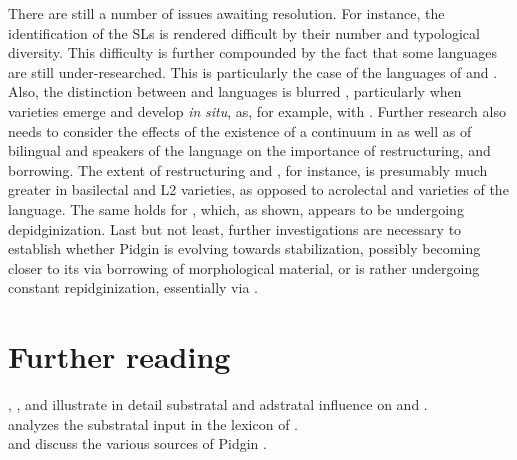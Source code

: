 \documentclass[output=paper]{langsci/langscibook}
\begin{document}
  There are still a number of issues awaiting resolution. For instance, the identification of the SLs is rendered difficult by their number and typological diversity. This difficulty is further compounded by the fact that some  languages are still under-researched. This is particularly the case of the  languages of   and . Also, the distinction between  and  languages is blurred \citep[132]{Nakao2012}, particularly when varieties emerge and develop \textit{in} \textit{situ}, as, for example, with  . Further research also needs to consider the effects of the existence of a  continuum in   as well as of bilingual and  speakers of the language on the  importance of restructuring,  and borrowing. The extent of restructuring and , for instance, is presumably much greater in basilectal and L2 varieties, as opposed to acrolectal and  varieties of the language. The same holds for  , which, as shown, appears to be undergoing depidginization. Last but not least, further investigations are necessary to establish whether  Pidgin  is evolving towards stabilization, possibly becoming closer to its  via borrowing of morphological material, or is rather undergoing constant repidginization, essentially via .  

\section*{Further reading}

\citet{Miller1993}, \citet{Nakao2012}, and \citet{Luffin2014} illustrate in detail substratal and adstratal influence on   and .\\
\citet{Avram2019} analyzes the substratal input in the lexicon of .\\
\citet{Avram2017article} and \citet{Bakir2017} discuss the various sources of  Pidgin .
\end{document}
